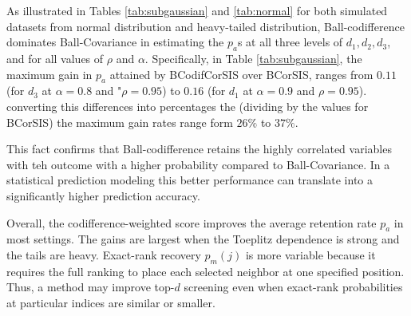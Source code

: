 \documentclass[11pt]{article}
\theoremstyle{definition}
\begin{document}
As illustrated in Tables \ref{tab:subgaussian} and \ref{tab:normal} 
for both simulated datasets from normal distribution and heavy-tailed distribution, Ball-codifference dominates Ball-Covariance in estimating the \(p_a\)s at all three levels of $d_1, d_2, d_3$, and for all values of $\rho$ and $\alpha$. 
Specifically, in Table \ref{tab:subgaussian}, the maximum gain in \(p_a\) attained by BCodifCor\-SIS over BCor\-SIS, ranges from $0.11$ (for $d_3$ at $\alpha=0.8$ and "$\rho=0.95$) to $0.16$ (for $d_1$ at $\alpha=0.9$ and $\rho=0.95$). converting this differences into percentages the (dividing by the values for BCor\-SIS) the maximum gain rates range form $26\%$ to $37\%$.  




This fact confirms that Ball-codifference retains the highly correlated variables with teh outcome with a higher probability compared to Ball-Covariance. In a statistical prediction modeling this better performance can translate into a significantly higher prediction accuracy.

Overall, the codifference-weighted score improves the average retention rate \(p_a\) in most settings.  The gains are largest when the Toeplitz dependence is strong and the tails are heavy.  Exact-rank recovery \(p_m(j)\) is more variable because it requires the full ranking to place each selected neighbor at one specified position.  Thus, a method may improve top-\(d\) screening even when exact-rank probabilities at particular indices are similar or smaller.
\end{document}
